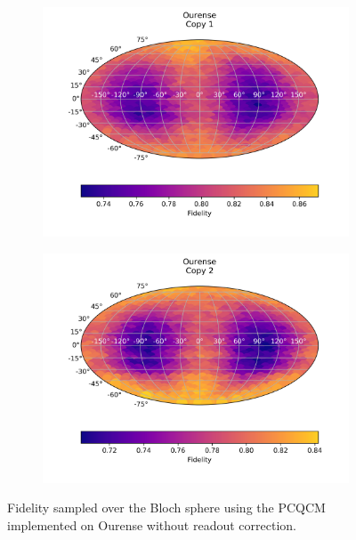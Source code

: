   
  \begin{figure}[H]
    \centering
    \begin{subfigure}{.5\textwidth}
      \centering
      \includegraphics[width=\textwidth]{Figures/PhaseCovariant/IBM/FullSphere/results_ourense_copy1.png}
      
      \label{fig:pc_uncorrected_ourense_sphere_1}
    \end{subfigure}%
    \begin{subfigure}{.5\textwidth}
      \centering
      \includegraphics[width=\textwidth]{Figures/PhaseCovariant/IBM/FullSphere/results_ourense_copy2.png}
      
      \label{fig:pc_uncorrected_ourense_sphere_2}
    \end{subfigure}
    \caption{Fidelity sampled over the Bloch sphere using the PCQCM implemented on Ourense without readout correction.}
    \label{fig:pc_uncorrected_ourense_sphere}
  \end{figure}
  
